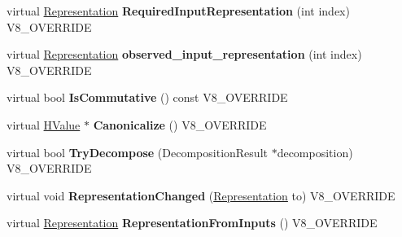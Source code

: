 \begin{DoxyCompactItemize}
\item 
\hypertarget{classv8_1_1internal_1_1_v8___f_i_n_a_l_a6c6d1f37f40b113d8f4062f1ffff7215}{}virtual \hyperlink{classv8_1_1internal_1_1_representation}{Representation} {\bfseries Required\+Input\+Representation} (int index) V8\+\_\+\+O\+V\+E\+R\+R\+I\+D\+E\label{classv8_1_1internal_1_1_v8___f_i_n_a_l_a6c6d1f37f40b113d8f4062f1ffff7215}

\item 
\hypertarget{classv8_1_1internal_1_1_v8___f_i_n_a_l_a0ae00f2f3ee0cfa82cd7f5d92e2db4b4}{}virtual \hyperlink{classv8_1_1internal_1_1_representation}{Representation} {\bfseries observed\+\_\+input\+\_\+representation} (int index) V8\+\_\+\+O\+V\+E\+R\+R\+I\+D\+E\label{classv8_1_1internal_1_1_v8___f_i_n_a_l_a0ae00f2f3ee0cfa82cd7f5d92e2db4b4}

\item 
\hypertarget{classv8_1_1internal_1_1_v8___f_i_n_a_l_afbf350c98bc012a32e462f18ba21a137}{}virtual bool {\bfseries Is\+Commutative} () const V8\+\_\+\+O\+V\+E\+R\+R\+I\+D\+E\label{classv8_1_1internal_1_1_v8___f_i_n_a_l_afbf350c98bc012a32e462f18ba21a137}

\item 
\hypertarget{classv8_1_1internal_1_1_v8___f_i_n_a_l_aad5f871e0a6782c02e742ec017eca3cd}{}virtual \hyperlink{classv8_1_1internal_1_1_h_value}{H\+Value} $\ast$ {\bfseries Canonicalize} () V8\+\_\+\+O\+V\+E\+R\+R\+I\+D\+E\label{classv8_1_1internal_1_1_v8___f_i_n_a_l_aad5f871e0a6782c02e742ec017eca3cd}

\item 
\hypertarget{classv8_1_1internal_1_1_v8___f_i_n_a_l_a01868e84795163ab610a20c7f7c4f7ea}{}virtual bool {\bfseries Try\+Decompose} (Decomposition\+Result $\ast$decomposition) V8\+\_\+\+O\+V\+E\+R\+R\+I\+D\+E\label{classv8_1_1internal_1_1_v8___f_i_n_a_l_a01868e84795163ab610a20c7f7c4f7ea}

\item 
\hypertarget{classv8_1_1internal_1_1_v8___f_i_n_a_l_a4bd08651f544a2ca0fe2606c4a6ca806}{}virtual void {\bfseries Representation\+Changed} (\hyperlink{classv8_1_1internal_1_1_representation}{Representation} to) V8\+\_\+\+O\+V\+E\+R\+R\+I\+D\+E\label{classv8_1_1internal_1_1_v8___f_i_n_a_l_a4bd08651f544a2ca0fe2606c4a6ca806}

\item 
\hypertarget{classv8_1_1internal_1_1_v8___f_i_n_a_l_adf198742368d46a5275c303414fdfc1d}{}virtual \hyperlink{classv8_1_1internal_1_1_representation}{Representation} {\bfseries Representation\+From\+Inputs} () V8\+\_\+\+O\+V\+E\+R\+R\+I\+D\+E\label{classv8_1_1internal_1_1_v8___f_i_n_a_l_adf198742368d46a5275c303414fdfc1d}


\end{DoxyCompactItemize}
